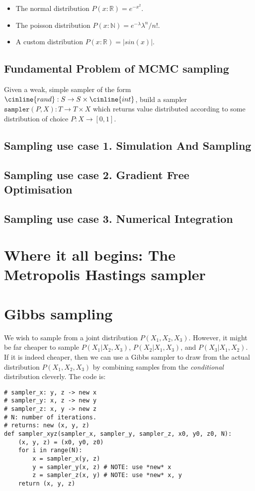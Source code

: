 \documentclass[titlepage]{article}
\newcommand{\N}{\mathbb{N}}
\newcommand{\R}{\mathbb{R}}
\begin{document}
\begin{itemize}
    \item The normal distribution $P(x: \R) = e^{-x^2}$.
    \item The poisson distribution $P(x: \N) = e^{-\lambda} \lambda^n/n!$.
    \item A custom distribution $P(x: \R) = |sin(x)|$.
\end{itemize}

\subsection{Fundamental Problem of MCMC sampling}
Given a weak, simple sampler of the form $\cinline{rand} : S \rightarrow S \times \cinline{int}$,
build a sampler $\texttt{sampler}(P, X): T \rightarrow T \times X$ which returns
value distributed according to some distribution of choice $P: X \rightarrow [0, 1]$.

\subsection{Sampling use case 1. Simulation And Sampling}
\subsection{Sampling use case 2. Gradient Free Optimisation}
\subsection{Sampling use case 3. Numerical Integration}

\section{Where it all begins: The Metropolis Hastings sampler}

\section{Gibbs sampling}
We wish to sample from a joint distribution $P(X_1, X_2, X_3)$. However, it might
be far cheaper to sample $P(X_1 | X_2, X_3)$, $P(X_2 | X_1, X_3)$, and
$P(X_3 | X_1, X_2)$. If it is indeed cheaper, then we can use a Gibbs sampler
to draw from the actual distribution $P(X_1, X_2, X_3)$ by combining samples
from the \emph{conditional} distribution cleverly. The code is:

\begin{verbatim}
# sampler_x: y, z -> new x
# sampler_y: x, z -> new y
# sampler_z: x, y -> new z
# N: number of iterations.
# returns: new (x, y, z)
def sampler_xyz(sampler_x, sampler_y, sampler_z, x0, y0, z0, N):
    (x, y, z) = (x0, y0, z0)
    for i in range(N):
        x = sampler_x(y, z)
        y = sampler_y(x, z) # NOTE: use *new* x
        z = sampler_z(x, y) # NOTE: use *new* x, y
    return (x, y, z)
\end{verbatim}
\end{document}
